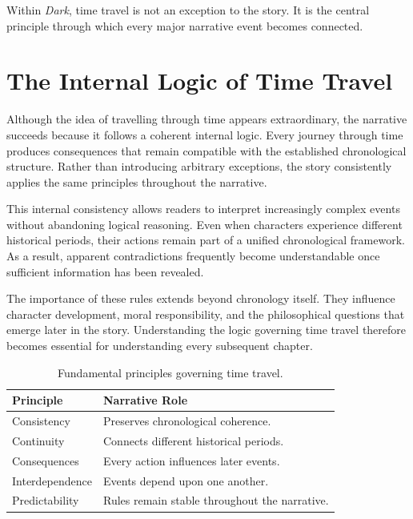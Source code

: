 \documentclass[12pt,oneside,openany]{book}
\begin{document}
\begin{tcolorbox}[colback=gray!8,colframe=black,title=Key Observation]
Within \textit{Dark}, time travel is not an exception to the story. It is the
central principle through which every major narrative event becomes connected.
\end{tcolorbox}
\section{The Internal Logic of Time Travel}

Although the idea of travelling through time appears extraordinary, the
narrative succeeds because it follows a coherent internal logic. Every journey
through time produces consequences that remain compatible with the established
chronological structure. Rather than introducing arbitrary exceptions, the
story consistently applies the same principles throughout the narrative.

This internal consistency allows readers to interpret increasingly complex
events without abandoning logical reasoning. Even when characters experience
different historical periods, their actions remain part of a unified
chronological framework. As a result, apparent contradictions frequently become
understandable once sufficient information has been revealed.

The importance of these rules extends beyond chronology itself. They influence
character development, moral responsibility, and the philosophical questions
that emerge later in the story. Understanding the logic governing time travel
therefore becomes essential for understanding every subsequent chapter.

\begin{table}[H]
\centering
\begin{tabular}{|p{4.2cm}|p{7.8cm}|}
\hline
\textbf{Principle} & \textbf{Narrative Role}\\
\hline
Consistency & Preserves chronological coherence.\\
\hline
Continuity & Connects different historical periods.\\
\hline
Consequences & Every action influences later events.\\
\hline
Interdependence & Events depend upon one another.\\
\hline
Predictability & Rules remain stable throughout the narrative.\\
\hline
\end{tabular}
\caption{Fundamental principles governing time travel.}
\end{table}
\end{document}
